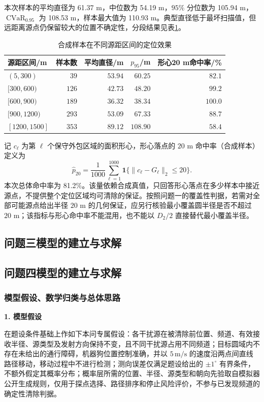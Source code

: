 \documentclass[zihao=-4,a4paper,UTF8,fontset=none]{ctexart}
\begin{document}
本次样本的平均直径为 61.37 m，中位数为 54.19 m，$95\%$ 分位数为 105.94 m，$\operatorname{CVaR}_{0.95}$ 为 108.53 m，样本最大值为 110.93 m。典型直径低于最坏扫描值，但远距离源点仍保留较大的位置不确定性，分段结果见表\ref{tab:bands}。

\begin{table}[htbp]
\centering\small
\caption{合成样本在不同源距区间的定位效果}
\label{tab:bands}
\begin{tabular}{lrrrr}
\toprule
源距区间/m & 样本数 & 平均直径/m & $p_{95}$/m & 形心20 m命中率/\%\\
\midrule
$(5,300)$ & $39$ & $53.94$ & $60.25$ & $82.1$ \\
$[300,600)$ & $126$ & $42.73$ & $48.20$ & $99.2$ \\
$[600,900)$ & $189$ & $36.32$ & $38.34$ & $100.0$ \\
$[900,1200)$ & $293$ & $53.09$ & $67.33$ & $88.7$ \\
$[1200,1500]$ & $353$ & $89.12$ & $108.90$ & $58.4$ \\
\bottomrule
\end{tabular}
\end{table}

记 $c_\ell$ 为第 $\ell$ 个保守外包区域的面积形心，形心落点的 $20$ m 命中率（合成样本）定义为
\[
\widehat p_{20}=\frac{1}{1000}\sum_{\ell=1}^{1000}
\mathbf1\{\|c_\ell-G_\ell\|_2\le20\}.
\]
本次总体命中率为 81.2\%。该量依赖合成真值，只回答形心落点在多少样本中接近源点，不提供整个定位区域均可清除的保证。按照问题一的覆盖性判据，若需对全部可能源点给出半径 $20$ m 的几何保证，应另行核验最小覆盖圆半径是否不超过 $20$ m；该指标与形心命中率不能混用，也不能以 $D_2/2$ 直接替代最小覆盖半径。


\subsection{问题三模型的建立与求解}


\subsection{问题四模型的建立与求解}
\subsubsection{模型假设、数学归类与总体思路}

\noindent\textbf{1. 模型假设}

在题设条件基础上作如下本问专属假设：各干扰源在被清除前位置、频道、有效接收半径、源类型及发射方向保持不变，且不同干扰源占用不同频道；目标圆域内不存在未给出的通行障碍，机器狗位置控制准确，并以 $5\,\mathrm{m/s}$ 的速度沿两点间直线路径移动，移动过程中不进行检测；测向误差仅满足题设给出的 $\pm1^\circ$ 有界条件，不额外假定其概率分布；概率层所需的位置、半径、源类型和朝向先验取自模拟器公开生成规则，仅用于探点选择、路径排序和停止风险评价，不参与已发现频道的确定性清除判据。
\end{document}
